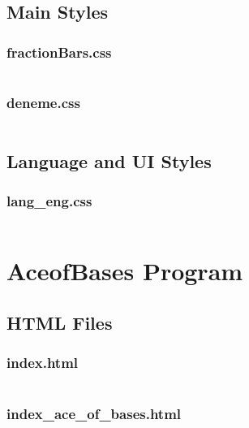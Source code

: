 \documentclass{article}
\begin{document}
\subsection{Main Styles}
\subsubsection{fractionBars.css}
\inputminted{css}{Fraction_Bars_files/fractionBars.css}

\subsubsection{deneme.css}
\inputminted{css}{Fraction_Bars_files/deneme.css}

\subsection{Language and UI Styles}
\subsubsection{lang\_eng.css}
\inputminted{css}{Fraction_Bars_files/lang_eng.css}


\section{AceofBases Program}
\subsection{HTML Files}
\subsubsection{index.html}
\inputminted{html}{AceofBases/index.html}

\subsubsection{index\_ace\_of\_bases.html}
\inputminted{html}{AceofBases/index_ace_of_bases.html}
\end{document}
